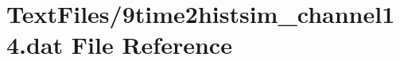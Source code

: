 \hypertarget{9time2histsim__channel14_8dat}{}\section{Text\+Files/9time2histsim\+\_\+channel14.dat File Reference}
\label{9time2histsim__channel14_8dat}
